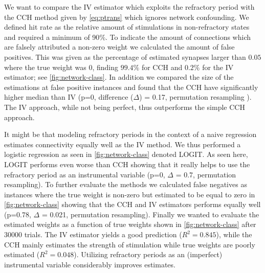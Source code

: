 \documentclass[11pt]{article}
\begin{document}
We want to compare the IV estimator which exploits the refractory period with the CCH method given by \cref{eq:ptrans} which ignores network confounding. We defined hit rate as the relative amount of stimulations in non-refractory states and required a minimum of 90$\%$. To indicate the amount of connections which are falsely attributed a non-zero weight we calculated the amount of false positives. This was given as the percentage of estimated synapses larger than $ 0.05 $ where the true weight was $ 0 $, finding $ 99.4\% $ for CCH and $ 0.2\% $ for the IV estimator; see \cref{fig:network-class}. In addition we compared the size of the estimations at false positive instances and found that the CCH have significantly higher median than IV (p=0, difference ($\Delta$) = 0.17, permutation resampling \citep{wassermann2006all}). The IV approach, while not being perfect, thus outperforms the simple CCH approach.

It might be that modeling refractory periods in the context of a naive regression estimates connectivity equally well as the IV method. We thus performed a logistic regression as seen in \cref{fig:network-class} denoted LOGIT. As seen here, LOGIT performs even worse than CCH showing that it really helps to use the refractory period as an instrumental variable (p=0, $\Delta$ = 0.7, permutation resampling). To further evaluate the methods we calculated false negatives as instances where the true weight is non-zero but estimated to be equal to zero in \cref{fig:network-class} showing that the CCH and IV estimators performs equally well (p=0.78, $\Delta$ = 0.021, permutation resampling). Finally we wanted to evaluate the estimated weights as a function of true weights shown in \cref{fig:network-class} after 30000 trials. The IV estimator yields a good prediction ($ R^2 = 0.845 $), while the CCH mainly estimates the strength of stimulation while true weights are poorly estimated ($ R^2 = 0.048 $). Utilizing refractory periods as an (imperfect) instrumental variable considerably improves estimates.
\end{document}
